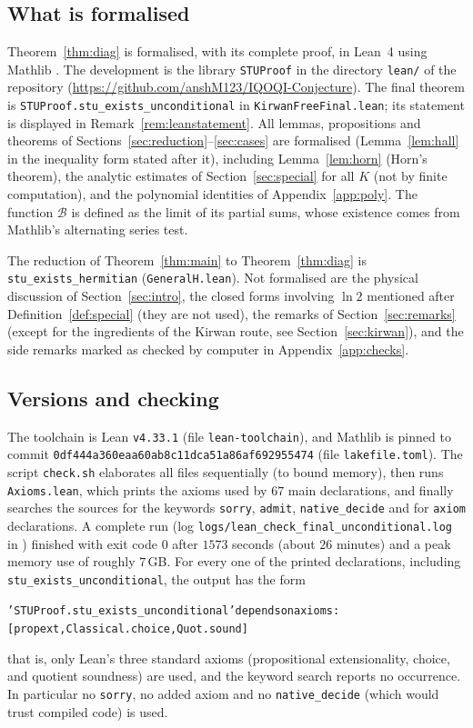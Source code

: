 \documentclass[11pt]{amsart}
\theoremstyle{definition}
\theoremstyle{remark}
\numberwithin{equation}{section}
\newcommand{\cB}{\mathcal{B}}
\newcommand{\lean}[1]{\texttt{#1}}
\begin{document}
\subsection{What is formalised}
Theorem~\ref{thm:diag} is formalised, with its complete proof, in Lean~4 \cite{deMouraUllrich2021}
using Mathlib \cite{mathlib2020}. The development is the library \lean{STUProof} in the directory
\lean{lean/} of the repository \cite{STUrepo} (\url{https://github.com/anshM123/IQOQI-Conjecture}). The
final theorem is \lean{STUProof.stu\_exists\_unconditional} in \lean{KirwanFreeFinal.lean}; its statement
is displayed in Remark~\ref{rem:leanstatement}. All lemmas, propositions and theorems of
Sections~\ref{sec:reduction}--\ref{sec:cases} are formalised (Lemma~\ref{lem:hall} in the inequality form
stated after it), including Lemma~\ref{lem:horn} (Horn's theorem), the analytic estimates of
Section~\ref{sec:special} for all $K$ (not by finite computation), and the polynomial identities of
Appendix~\ref{app:poly}. The function $\cB$ is defined as the limit of its partial sums, whose existence
comes from Mathlib's alternating series test.

The reduction of Theorem~\ref{thm:main} to Theorem~\ref{thm:diag} is \lean{stu\_exists\_hermitian}
(\lean{GeneralH.lean}). Not formalised are the physical discussion of Section~\ref{sec:intro}, the closed
forms involving $\ln2$ mentioned after Definition~\ref{def:special} (they are not used), the remarks of
Section~\ref{sec:remarks} (except for the ingredients of the Kirwan route, see Section~\ref{sec:kirwan}),
and the side remarks marked as checked by computer in Appendix~\ref{app:checks}.

\subsection{Versions and checking}
The toolchain is Lean \lean{v4.33.1} (file \lean{lean-toolchain}), and Mathlib is pinned to commit
\lean{0df444a360eaa60ab8c11dca51a86af692955474} (file \lean{lakefile.toml}). The script
\lean{check.sh} elaborates all files sequentially (to bound memory), then runs \lean{Axioms.lean}, which
prints the axioms used by $67$ main declarations, and finally searches the sources for the keywords
\lean{sorry}, \lean{admit}, \lean{native\_decide} and for \lean{axiom} declarations. A complete run
(log \lean{logs/lean\_check\_final\_unconditional.log} in \cite{STUrepo}) finished with exit code $0$
after $1573$ seconds (about $26$ minutes) and a peak memory use of roughly $7$\,GB. For every one of the
printed declarations, including \lean{stu\_exists\_unconditional}, the output has the form
\begin{alltt}\small
'STUProof.stu_exists_unconditional' depends on axioms:
    [propext, Classical.choice, Quot.sound]
\end{alltt}
that is, only Lean's three standard axioms (propositional extensionality, choice, and quotient
soundness) are used, and the keyword search reports no occurrence. In particular no \lean{sorry}, no
added axiom and no \lean{native\_decide} (which would trust compiled code) is used.
\end{document}
